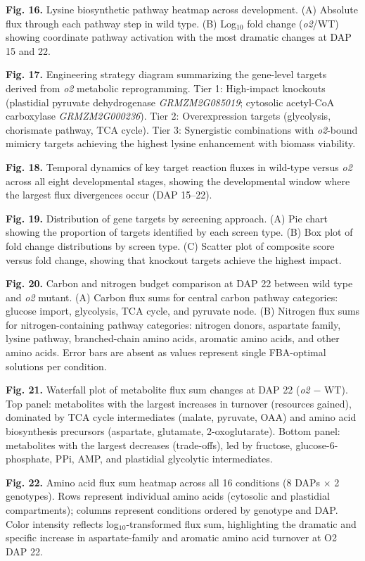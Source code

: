 \documentclass[12pt,a4paper]{article}
\begin{document}
\textbf{Fig. 16.} Lysine biosynthetic pathway heatmap across development. (A) Absolute flux through each pathway step in wild type. (B) Log$_{10}$ fold change (\textit{o2}/WT) showing coordinate pathway activation with the most dramatic changes at DAP 15 and 22.

\textbf{Fig. 17.} Engineering strategy diagram summarizing the gene-level targets derived from \textit{o2} metabolic reprogramming. Tier 1: High-impact knockouts (plastidial pyruvate dehydrogenase \textit{GRMZM2G085019}; cytosolic acetyl-CoA carboxylase \textit{GRMZM2G000236}). Tier 2: Overexpression targets (glycolysis, chorismate pathway, TCA cycle). Tier 3: Synergistic combinations with \textit{o2}-bound mimicry targets achieving the highest lysine enhancement with biomass viability.

\textbf{Fig. 18.} Temporal dynamics of key target reaction fluxes in wild-type versus \textit{o2} across all eight developmental stages, showing the developmental window where the largest flux divergences occur (DAP 15--22).

\textbf{Fig. 19.} Distribution of gene targets by screening approach. (A) Pie chart showing the proportion of targets identified by each screen type. (B) Box plot of fold change distributions by screen type. (C) Scatter plot of composite score versus fold change, showing that knockout targets achieve the highest impact.

\textbf{Fig. 20.} Carbon and nitrogen budget comparison at DAP 22 between wild type and \textit{o2} mutant. (A) Carbon flux sums for central carbon pathway categories: glucose import, glycolysis, TCA cycle, and pyruvate node. (B) Nitrogen flux sums for nitrogen-containing pathway categories: nitrogen donors, aspartate family, lysine pathway, branched-chain amino acids, aromatic amino acids, and other amino acids. Error bars are absent as values represent single FBA-optimal solutions per condition.

\textbf{Fig. 21.} Waterfall plot of metabolite flux sum changes at DAP 22 (\textit{o2} $-$ WT). Top panel: metabolites with the largest increases in turnover (resources gained), dominated by TCA cycle intermediates (malate, pyruvate, OAA) and amino acid biosynthesis precursors (aspartate, glutamate, 2-oxoglutarate). Bottom panel: metabolites with the largest decreases (trade-offs), led by fructose, glucose-6-phosphate, PPi, AMP, and plastidial glycolytic intermediates.

\textbf{Fig. 22.} Amino acid flux sum heatmap across all 16 conditions (8 DAPs $\times$ 2 genotypes). Rows represent individual amino acids (cytosolic and plastidial compartments); columns represent conditions ordered by genotype and DAP. Color intensity reflects log$_{10}$-transformed flux sum, highlighting the dramatic and specific increase in aspartate-family and aromatic amino acid turnover at O2 DAP 22.
\end{document}
